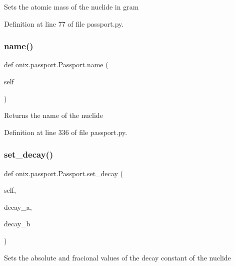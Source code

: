 \begin{DoxyVerb}Sets the atomic mass of the nuclide in gram\end{DoxyVerb}
 

Definition at line 77 of file passport.\+py.

\mbox{\label{classonix_1_1passport_1_1Passport_a4adab1f18d92d2c23f2b302a13318fcc}} 
\subsubsection{\texorpdfstring{name()}{name()}}
{\footnotesize\ttfamily def onix.\+passport.\+Passport.\+name (\begin{DoxyParamCaption}\item[{}]{self }\end{DoxyParamCaption})}

\begin{DoxyVerb}Returns the name of the nuclide\end{DoxyVerb}
 

Definition at line 336 of file passport.\+py.

\mbox{\label{classonix_1_1passport_1_1Passport_a3ae1a55867af7d63e5f555ba3cb1b87b}} 
\subsubsection{\texorpdfstring{set\+\_\+decay()}{set\_decay()}}
{\footnotesize\ttfamily def onix.\+passport.\+Passport.\+set\+\_\+decay (\begin{DoxyParamCaption}\item[{}]{self,  }\item[{}]{decay\+\_\+a,  }\item[{}]{decay\+\_\+b }\end{DoxyParamCaption})}

\begin{DoxyVerb}Sets the absolute and fracional values of the decay constant of the nuclide\end{DoxyVerb}
 

